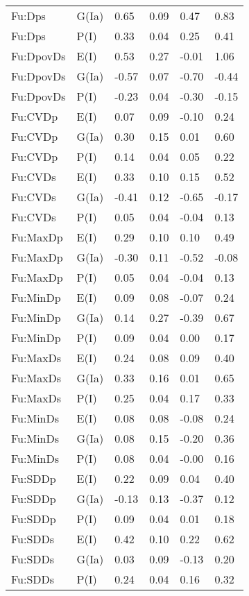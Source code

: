 \begin{center}
\begin{longtable}{|p{1.1in}|p{0.7in}|p{0.7in}|p{0.6in}|p{0.6in}|p{0.6in}|}
  Fu:Dps & G(Ia) & 0.65 & 0.09 & 0.47 & 0.83 \\ 
  Fu:Dps & P(I) & 0.33 & 0.04 & 0.25 & 0.41 \\ 
  Fu:DpovDs & E(I) & 0.53 & 0.27 & -0.01 & 1.06 \\ 
  Fu:DpovDs & G(Ia) & -0.57 & 0.07 & -0.70 & -0.44 \\ 
  Fu:DpovDs & P(I) & -0.23 & 0.04 & -0.30 & -0.15 \\ 
  Fu:CVDp & E(I) & 0.07 & 0.09 & -0.10 & 0.24 \\ 
  Fu:CVDp & G(Ia) & 0.30 & 0.15 & 0.01 & 0.60 \\ 
  Fu:CVDp & P(I) & 0.14 & 0.04 & 0.05 & 0.22 \\ 
  Fu:CVDs & E(I) & 0.33 & 0.10 & 0.15 & 0.52 \\ 
  Fu:CVDs & G(Ia) & -0.41 & 0.12 & -0.65 & -0.17 \\ 
  Fu:CVDs & P(I) & 0.05 & 0.04 & -0.04 & 0.13 \\ 
  Fu:MaxDp & E(I) & 0.29 & 0.10 & 0.10 & 0.49 \\ 
  Fu:MaxDp & G(Ia) & -0.30 & 0.11 & -0.52 & -0.08 \\ 
  Fu:MaxDp & P(I) & 0.05 & 0.04 & -0.04 & 0.13 \\ 
  Fu:MinDp & E(I) & 0.09 & 0.08 & -0.07 & 0.24 \\ 
  Fu:MinDp & G(Ia) & 0.14 & 0.27 & -0.39 & 0.67 \\ 
  Fu:MinDp & P(I) & 0.09 & 0.04 & 0.00 & 0.17 \\ 
  Fu:MaxDs & E(I) & 0.24 & 0.08 & 0.09 & 0.40 \\ 
  Fu:MaxDs & G(Ia) & 0.33 & 0.16 & 0.01 & 0.65 \\ 
  Fu:MaxDs & P(I) & 0.25 & 0.04 & 0.17 & 0.33 \\ 
  Fu:MinDs & E(I) & 0.08 & 0.08 & -0.08 & 0.24 \\ 
  Fu:MinDs & G(Ia) & 0.08 & 0.15 & -0.20 & 0.36 \\ 
  Fu:MinDs & P(I) & 0.08 & 0.04 & -0.00 & 0.16 \\ 
  Fu:SDDp & E(I) & 0.22 & 0.09 & 0.04 & 0.40 \\ 
  Fu:SDDp & G(Ia) & -0.13 & 0.13 & -0.37 & 0.12 \\ 
  Fu:SDDp & P(I) & 0.09 & 0.04 & 0.01 & 0.18 \\ 
  Fu:SDDs & E(I) & 0.42 & 0.10 & 0.22 & 0.62 \\ 
  Fu:SDDs & G(Ia) & 0.03 & 0.09 & -0.13 & 0.20 \\ 
  Fu:SDDs & P(I) & 0.24 & 0.04 & 0.16 & 0.32 \\ 

\end{longtable}
\end{center}
